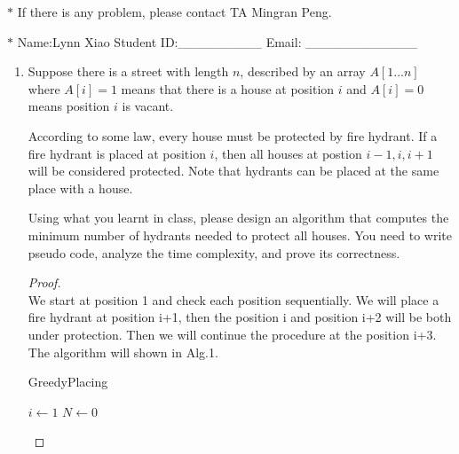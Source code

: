 \documentclass[12pt,a4paper]{article}
\theoremstyle{definition}
\begin{document}
\noindent

\noindent{}


\begin{center}
\footnotesize{\color{red}$*$ If there is any problem, please contact TA Mingran Peng.}\par
\footnotesize{\color{blue}$*$ Name:Lynn Xiao \quad Student ID:\_\_\_\_\_\_\_\_\_ \quad Email: \_\_\_\_\_\_\_\_\_\_\_\_}
\end{center}
\begin{enumerate}
    \item
    Suppose there is a street with length $n$, described by an array $A[1...n]$ where $A[i]=1$ means that there is a house at position $i$ and $A[i]=0$ means position $i$ is vacant.\par
	According to some law, every house must be protected by fire hydrant. If a fire hydrant is placed at position $i$, then all houses at postion $i-1,i,i+1$ will be considered protected. Note that hydrants can be placed at the same place with a house.\par
	Using what you learnt in class, please design an algorithm that computes the minimum number of hydrants needed to protect all houses. You need to write pseudo code, analyze the time complexity,  and prove its correctness.\par
    \begin{proof}
     ~\\
     We start at position 1 and check each position sequentially. We will place a fire hydrant at position i+1, then the position i and position i+2 will be both under protection. Then we will continue the procedure at the position i+3. The algorithm will shown in Alg.1.
     
     \begin{minipage}[t]{0.8\textwidth}
     	\begin{algorithm}[H]
     		\BlankLine
     		\caption{GreedyPlacing}
     		\label{Alg-selectionsort}
     		\BlankLine
     		$i\leftarrow 1$\;
     		$N\leftarrow0$\;
     		

\end{algorithm}
\end{minipage}
\end{proof}
\end{enumerate}
\end{document}

